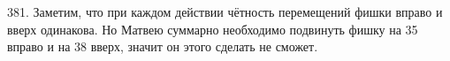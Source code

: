 381. Заметим, что при каждом действии чётность перемещений фишки вправо и вверх одинакова. Но Матвею суммарно необходимо подвинуть фишку на 35 вправо и на 38 вверх, значит он этого сделать не сможет.\\
